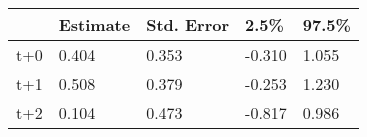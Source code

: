\begin{tabular}{lllll}
  \toprule
  & Estimate & Std. Error & 2.5\% & 97.5\% \\ 
  \midrule
t+0 & 0.404 & 0.353 & -0.310 & 1.055 \\ 
  t+1 & 0.508 & 0.379 & -0.253 & 1.230 \\ 
  t+2 & 0.104 & 0.473 & -0.817 & 0.986 \\ 
   \bottomrule
\end{tabular}
